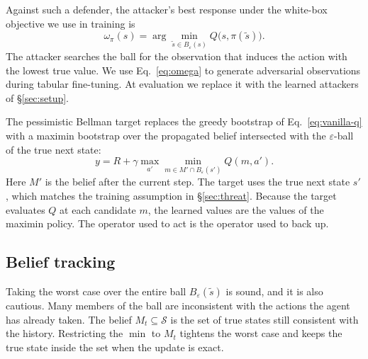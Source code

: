 \documentclass[10pt,twocolumn]{article}
\begin{document}
Against such a defender, the attacker's best response under the white-box objective we use in training is
\begin{equation}
\omega_\pi(s)=\arg\min_{\tilde s\in B_\varepsilon(s)} Q\bigl(s,\pi(\tilde s)\bigr).
\label{eq:omega}
\end{equation}
The attacker searches the ball for the observation that induces the action with the lowest true value.
We use Eq.~\eqref{eq:omega} to generate adversarial observations during tabular fine-tuning.
At evaluation we replace it with the learned attackers of \S\ref{sec:setup}.

The pessimistic Bellman target replaces the greedy bootstrap of Eq.~\eqref{eq:vanilla-q} with a maximin bootstrap over the propagated belief intersected with the $\varepsilon$-ball of the true next state:
\begin{equation}
y = R + \gamma \max_{a'} \min_{m \in M' \cap B_\varepsilon(s')} Q(m, a').
\label{eq:pes-target}
\end{equation}
Here $M'$ is the belief after the current step.
The target uses the true next state $s'$, which matches the training assumption in \S\ref{sec:threat}.
Because the target evaluates $Q$ at each candidate $m$, the learned values are the values of the maximin policy.
The operator used to act is the operator used to back up.

\subsection{Belief tracking}
\label{sec:belief}

Taking the worst case over the entire ball $B_\varepsilon(\tilde s)$ is sound, and it is also cautious.
Many members of the ball are inconsistent with the actions the agent has already taken.
The belief $M_t\subseteq\mathcal{S}$ is the set of true states still consistent with the history.
Restricting the $\min$ to $M_t$ tightens the worst case and keeps the true state inside the set when the update is exact.
\end{document}
